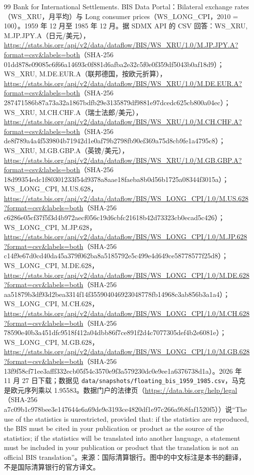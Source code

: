 \begin{thebibliography}{99}
 Bank for International Settlements. BIS Data Portal：Bilateral exchange rates（WS\_XRU，月平均）与 Long consumer prices（WS\_LONG\_CPI，2010 = 100）。1959 年 12 月至 1985 年 12 月。据 SDMX API 的 CSV 回答：WS\_XRU, M.JP.JPY.A（日元/美元），\url{https://stats.bis.org/api/v2/data/dataflow/BIS/WS_XRU/1.0/M.JP.JPY.A?format=csv&labels=both}（SHA-256 01dd878e09085c6f66a14693c0f881d6afba2e32c5f0e0f359df5043b0af18d9）；WS\_XRU, M.DE.EUR.A（联邦德国，按欧元折算），\url{https://stats.bis.org/api/v2/data/dataflow/BIS/WS_XRU/1.0/M.DE.EUR.A?format=csv&labels=both}（SHA-256 287471586b87a73a32a1867bdfb29e3135879df9881e97dcedc625cb800a04ec）；WS\_XRU, M.CH.CHF.A（瑞士法郎/美元），\url{https://stats.bis.org/api/v2/data/dataflow/BIS/WS_XRU/1.0/M.CH.CHF.A?format=csv&labels=both}（SHA-256 de8f789a4a4f539804b71942d1e0af79b2798fb90ef369a75d8cb9fe1a4795c8）；WS\_XRU, M.GB.GBP.A（英镑/美元），\url{https://stats.bis.org/api/v2/data/dataflow/BIS/WS_XRU/1.0/M.GB.GBP.A?format=csv&labels=both}（SHA-256 18d99354edc1f80301233f54d9378a8aae18faeba8b0d56b1725a08344f3015a）；WS\_LONG\_CPI, M.US.628，\url{https://stats.bis.org/api/v2/data/dataflow/BIS/WS_LONG_CPI/1.0/M.US.628?format=csv&labels=both}（SHA-256 c6286e05cf37f5f3d4b972aecf056c19d6cbfc21618b42d73323cb0ecad5c426）；WS\_LONG\_CPI, M.JP.628，\url{https://stats.bis.org/api/v2/data/dataflow/BIS/WS_LONG_CPI/1.0/M.JP.628?format=csv&labels=both}（SHA-256 c14f9e67d0cd40da45a379f062ba8a5185792e5c499e4d649ce58778577f25d8）；WS\_LONG\_CPI, M.DE.628，\url{https://stats.bis.org/api/v2/data/dataflow/BIS/WS_LONG_CPI/1.0/M.DE.628?format=csv&labels=both}（SHA-256 aa51879b3df93d2bea3314f14f355904046923048778fb14968c3ab856b3a1a4）；WS\_LONG\_CPI, M.CH.628，\url{https://stats.bis.org/api/v2/data/dataflow/BIS/WS_LONG_CPI/1.0/M.CH.628?format=csv&labels=both}（SHA-256 78590e40b3a451dfc9518f412a04dbb86f7ce891f2d4c7077305def4b2e6081e）；WS\_LONG\_CPI, M.GB.628，\url{https://stats.bis.org/api/v2/data/dataflow/BIS/WS_LONG_CPI/1.0/M.GB.628?format=csv&labels=both}（SHA-256 13f9f58cf71ee3afff332ecb05f54c3570e9f3a579230dc0e9ee1a6376738d1a）。2026 年 11 月 27 日下载；数据见 \texttt{data/snapshots/floating\_bis\_1959\_1985.csv}，马克是欧元序列乘以 1.95583。数据门户的法律页（\url{https://data.bis.org/help/legal}（SHA-256 a7c09b1c978bee3e147644e6a69de9e3193ce4820df1e97c266a9b8faf1520f5））说“The use of the statistics is unrestricted, provided that: if the statistics are reproduced, the BIS must be cited in your publication or product as the source of the statistics; if the statistics will be translated into another language, a statement must be included in your publication or product that the translation is not an official BIS translation”。来源：国际清算银行。图中的中文标注是本书的翻译，不是国际清算银行的官方译文。


\end{thebibliography}
